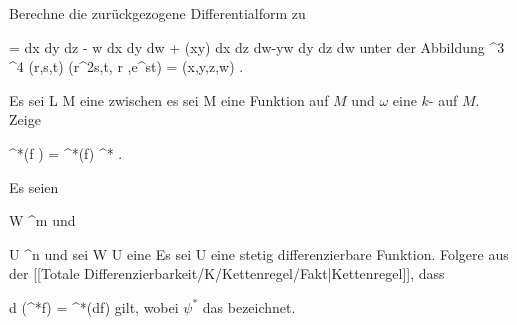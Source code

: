 {}
{

Berechne die zurückgezogene Differentialform
\mathl{\varphi^* \tau}{} zu

\mavergleichskettedisp
{\vergleichskette
{ \tau
}
{ =} { dx \wedge dy \wedge dz - w dx \wedge dy \wedge dw + \cos (xy)  dx \wedge dz \wedge dw-yw dy \wedge dz \wedge dw
}
{ } {
}
{ } {
}
{ } {
}
}
{}{}{}
unter der Abbildung
\maabbeledisp {\varphi} {\R^3} {\R^4
} {(r,s,t)} { (r^2s,t, \sin  r ,e^{st}) = (x,y,z,w)
} {.}

}
{} {}

{}
{

Es sei
\maabbdisp {\psi} { L } { M
} {}
eine
zwischen
es sei
 { M } {\R
} {}
eine Funktion auf $M$ und $\omega$ eine
$k$-
auf $M$. Zeige

\mavergleichskettedisp
{\vergleichskette
{ \psi^*(f \omega)
}
{ =} { \psi^*(f)  \psi^* \omega
}
{ } {
}
{ } {
}
{ } {
}
}
{}{}{.}

}
{} {}

{}
{

Es seien

\mavergleichskette
{\vergleichskette
{ W
}
{ \subseteq }{ \R^m
}
{  }{
}
{    }{
}
{   }{
}
}
{}{}{}
und

\mavergleichskette
{\vergleichskette
{ U
}
{ \subseteq }{ \R^n
}
{  }{
}
{    }{
}
{   }{
}
}
{}{}{}
und sei
\maabbdisp {\psi} { W } { U
} {}
eine
Es sei
 { U } {\R
} {}
eine stetig differenzierbare Funktion. Folgere aus der
[[Totale Differenzierbarkeit/K/Kettenregel/Fakt|Kettenregel]],
dass

\mavergleichskettedisp
{\vergleichskette
{ d (\psi^*f)
}
{ =} { \psi^*(df)
}
{ } {
}
{ } {
}
{ } {
}
}
{}{}{}
gilt, wobei $\psi^*$ das
bezeichnet.

}
{} {}



